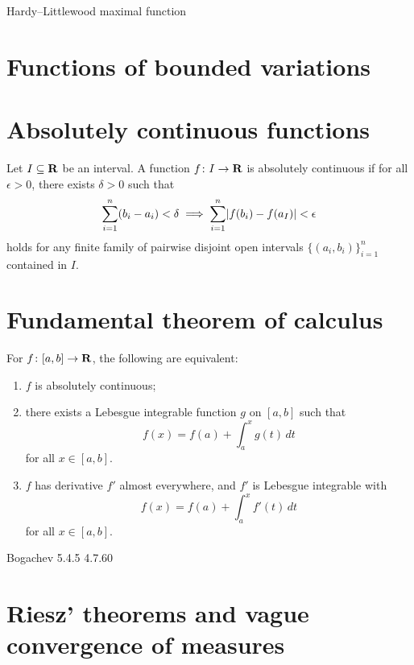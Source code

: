 \begin{defn}
    Hardy--Littlewood maximal function
\end{defn}

\begin{namedthm}
    
\end{namedthm}

\section{Functions of bounded variations}
\section{Absolutely continuous functions}
\begin{defn}
    Let $I \subseteq \mathbf{R}$ be an interval. A function $f\colon I\to \mathbf{R}$ is absolutely continuous if for all $\epsilon > 0$, there exists $\delta > 0$ such that \[
        \sum_{i=1}^n (b_i - a_i) < \delta \implies \sum_{i=1}^n \lvert f(b_i) - f(a_I) \rvert <\epsilon
    \] holds for any finite family of pairwise disjoint open intervals $\{(a_i,b_i)\}_{i=1}^n$ contained in $I$.
\end{defn}
\section{Fundamental theorem of calculus}
\begin{namedthm}
    For $f\colon [a,b]\to \mathbf{R}$, the following are equivalent: 
    \begin{enumerate}
        \item $f$ is absolutely continuous; 
        \item there exists a Lebesgue integrable function $g$ on $[a,b]$ such that \[
            f(x) = f(a) + \int_a^x g(t)\,dt
        \] for all $x \in [a,b]$.
        \item $f$ has derivative $f'$ almost everywhere, and $f'$ is Lebesgue integrable with \[
            f(x) = f(a) + \int_{a}^x f'(t)\,dt
        \] for all $x \in [a,b]$.
    \end{enumerate}
\end{namedthm}

Bogachev 5.4.5 4.7.60

\section{Riesz' theorems and vague convergence of measures}\label{sec:Riesz-thm}

